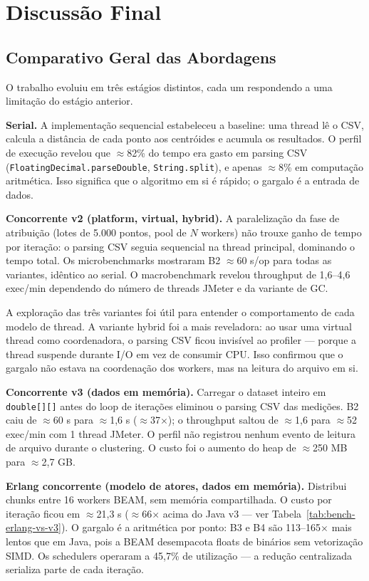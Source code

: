 \section{Discussão Final}

\subsection{Comparativo Geral das Abordagens}

O trabalho evoluiu em três estágios distintos, cada um respondendo a uma limitação
do estágio anterior.

\textbf{Serial.}
A implementação sequencial estabeleceu a baseline: uma thread lê o CSV, calcula a
distância de cada ponto aos centróides e acumula os resultados. O perfil de execução
revelou que $\approx$82\% do tempo era gasto em parsing CSV
(\texttt{FloatingDecimal.parseDouble}, \texttt{String.split}), e apenas $\approx$8\%
em computação aritmética. Isso significa que o algoritmo em si é rápido; o gargalo
é a entrada de dados.

\textbf{Concorrente v2 (platform, virtual, hybrid).}
A paralelização da fase de atribuição (lotes de 5.000 pontos, pool de $N$ workers)
não trouxe ganho de tempo por iteração: o parsing CSV seguia sequencial na thread
principal, dominando o tempo total. Os microbenchmarks mostraram B2
$\approx$60 s/op para todas as variantes, idêntico ao serial. O macrobenchmark
revelou throughput de 1,6--4,6 exec/min dependendo do número de threads JMeter
e da variante de GC.

A exploração das três variantes foi útil para entender o comportamento de cada
modelo de thread. A variante hybrid foi a mais reveladora: ao usar uma virtual thread
como coordenadora, o parsing CSV ficou invisível ao profiler --- porque a thread
suspende durante I/O em vez de consumir CPU. Isso confirmou que o gargalo não estava
na coordenação dos workers, mas na leitura do arquivo em si.

\textbf{Concorrente v3 (dados em memória).}
Carregar o dataset inteiro em \texttt{double[][]} antes do loop de iterações
eliminou o parsing CSV das medições. B2 caiu de $\approx$60 s para $\approx$1{,}6 s
($\approx$37$\times$); o throughput saltou de $\approx$1,6 para $\approx$52
exec/min com 1 thread JMeter. O perfil não registrou nenhum evento de leitura de
arquivo durante o clustering. O custo foi o aumento do heap de $\approx$250 MB
para $\approx$2{,}7 GB.

\textbf{Erlang concorrente (modelo de atores, dados em memória).}
Distribui chunks entre 16 workers BEAM, sem memória compartilhada. O custo por
iteração ficou em $\approx$21{,}3 s ($\approx$66$\times$ acima do Java v3 --- ver Tabela~\ref{tab:bench-erlang-vs-v3}). O gargalo é
a aritmética por ponto: B3 e B4 são 113--165$\times$ mais lentos que em Java,
pois a BEAM desempacota floats de binários sem vetorização SIMD. Os schedulers
operaram a 45{,}7\% de utilização — a redução centralizada serializa parte de
cada iteração.

